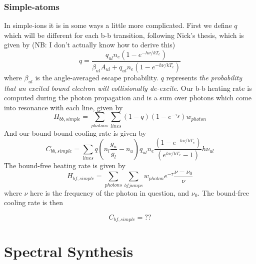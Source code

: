 \subsubsection{Simple-atoms}
\noindent
In simple-ions it is in some ways a little more complicated. 
First we define $q$ which will be different for each b-b transition, 
following Nick's thesis, which is given by 
(NB: I don't actually know how to derive this)
\begin{equation}
q = \frac{q_{ul} n_e (1 - e^{-h\nu/kT_e})}{\beta_{ul} A_{ul} + q_{ul} n_e (1 - e^{-h\nu/kT_e})}
\end{equation}
where $\beta_{ul}$ is the angle-averaged escape probability. 
$q$ represents {\em the probability that an excited bound electron
will collisionally de-excite}.
Our b-b heating rate is computed during the photon propagation and is a sum
over photons which come into resonance with each line, given by 
\begin{equation}
H_{bb,simple} = \sum_{photons} \sum_{lines} (1 - q) (1 - e^{-\tau_S}) w_{photon}
\end{equation}
And our bound bound cooling rate is given by 
\begin{equation}
C_{bb,simple} = \sum_{lines} q \left(n_l\frac{g_u}{g_l} - n_u\right) q_{ul} n_e 
\frac{(1 - e^{-h\nu/kT_e})}{(e^{h\nu/kT_e} - 1)}  h \nu_{ul}
\end{equation}
\noindent
The bound-free heating rate is given by
\begin{equation}
H_{bf,simple} = \sum_{photons} \sum_{bfjumps} w_{photon} e^{-\tau} \frac{\nu - \nu_{0}}{\nu}
\end{equation}
where $\nu$ here is the frequency of the photon in question, and $\nu_{0}$.
The bound-free cooling rate is then

\begin{equation}
C_{bf,simple} = ??
\end{equation}













\section{Spectral Synthesis}

